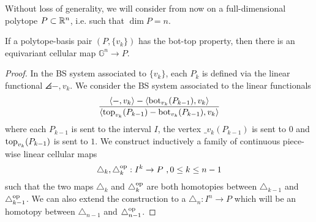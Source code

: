 Without loss of generality, we will consider from now on a full-dimensional polytope $P\subset \mathbb{R}^n$, i.e. such that $\dim P=n$. 

\begin{proposition}
    If a polytope-basis pair $(P,\{v_k\})$ has the bot-top property, then there is an equivariant cellular map $\mathbb{G}^n \to P$.
\end{proposition}

\begin{proof}
    In the BS system associated to $\{v_k\}$, each $P_k$ is defined via the linear functional $\angles{-,v_k}$. 
    We consider the BS system associated to the linear functionals
    \begin{equation} \label{eq:new-projection}
    \frac{\langle-,v_k\rangle-\langle\operatorname{bot}_{v_k}(P_{k-1}),v_k\rangle}{\langle\operatorname{top}_{v_k}(P_{k-1})-\operatorname{bot}_{v_k}(P_{k-1}),v_k\rangle}
    \end{equation}
    where each $P_{k-1}$ is sent to the interval $I$, the vertex $\bm_{v_k}(P_{k-1})$ is sent to $0$ and $\operatorname{top}_{v_k}(P_{k-1})$ is sent to $1$. 
    We construct inductively a family of continuous piece-wise linear cellular maps 
    \[
    \triangle_k, \triangle_k^{\mathrm{op}}: I^k \to P \ , 0 \leq k \leq n-1
    \]
    such that the two maps $\triangle_k$ and $\triangle_k^{\mathrm{op}}$ are both homotopies between $\triangle_{k-1}$ and $\triangle_{k-1}^{\mathrm{op}}$.
    We can also extend the construction to a $\triangle_n : I^n \to P$ which will be an homotopy between $\triangle_{n-1}$ and $\triangle_{n-1}^{\mathrm{op}}$.


\end{proof}
